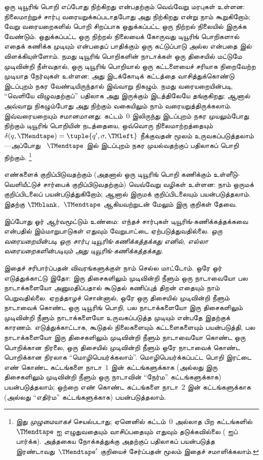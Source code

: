 \documentclass[../../../include/open-logic-section]{subfiles}
\begin{document}
ஒரு டியூரிங் பொறி எப்போது நிற்கிறது என்பதற்கும் வெவ்வேறு மரபுகள்
உள்ளன: நிலைமாற்றுச் சார்பு வரையறுக்கப்படாதபோது அது நிற்கிறது என்று
நாம் கூறுகிறோம்; வேறு வரையறைகளில் பொறி சிறப்பாக ஒதுக்கப்பட்ட ஒரு
நிற்றல் நிலையில் இருக்க வேண்டும். ஒதுக்கப்பட்ட ஒரு நிற்றல் நிலையைக்
கோருவது டியூரிங் பொறிகளால் எதைக் கணிக்க முடியும் என்பதைப் பாதிக்கும்
ஒரு கட்டுப்பாடு அல்ல என்பதை  இல் விளக்கியுள்ளோம்.
நமது டியூரிங் பொறிகளின் நாடாக்கள் ஒரு திசையில் மட்டுமே முடிவின்றி
நீள்வதால், ஒரு டியூரிங் பொறியால் ஒரு கட்டளையைச் சரியாக நிறைவேற்ற
முடியாத நேர்வுகள் உள்ளன: அது இடக்கோடிக் கட்டத்தை வாசித்துக்கொண்டு
இடப்புறம் நகர வேண்டியிருந்தால் இவ்வாறு நிகழும். நமது வரையறையின்படி,
``வெளியே விழுவதற்குப்'' பதிலாக அது இருக்கும் இடத்திலேயே தங்குகிறது;
ஆனால் அவ்வாறு நிகழும்போது அது நிற்கும் வகையிலும் நாம் வரையறுத்திருக்கலாம்.
இவ்வரையறையும் சமானமானது: கட்டம்~$0$ இலிருந்து இடப்புறம் நகர முயலும்போது
நிற்கும் டியூரிங் பொறியின் நடத்தையை, ஒவ்வொரு நிலைமாற்றத்தையும்
$\delta(q,\TMendtape) =
\tuple{q',\sigma,\TMleft}$ நீக்குவதன் மூலம் உருவகப்படுத்தலாம்---அப்போது
~$\TMendtape$ இல் இடப்புறம் நகர முயல்வதற்குப் பதிலாகப் பொறி நிற்கும்.
\footnote{இது \emph{முழுமையாகச்} செயல்படாது; ஏனெனில் கட்டம்~$0$
அல்லாத பிற கட்டங்களில் $\TMendtape$ ஐ எழுதுவதையும் வாசிப்பதையும்
எதுவும் தடுக்கவில்லை ( ஐப் பார்க்க). அத்தகைய
நோக்கத்துக்கு அதற்குப் பதிலாகப் பயன்படுத்த இரண்டாவது~$\TMendtape'$
குறியைச் சேர்ப்பதன் மூலம் இதைச் சமாளிக்கலாம்.}

எண்களைக் குறிப்பிடுவதற்கும் (அதனால் ஒரு டியூரிங் பொறி கணிக்கும்
உள்ளீடு-வெளியீட்டுச் சார்பைக் குறிப்பிடுவதற்கும்) வெவ்வேறு வழிகள்
உள்ளன: நாம் ஒருமக் குறிப்பிடலைப் பயன்படுத்துகிறோம்; ஆனால் இருமக்
குறிப்பிடலையும் பயன்படுத்தலாம். இதற்கு $\TMblank$,~$\TMendtape$
ஆகியவற்றுடன் மேலும் இரு குறிகள் தேவை.

இப்போது ஓர் ஆர்வமூட்டும் உண்மை: எந்தச் சார்புகள்
டியூரிங்-கணிக்கத்தக்கவை என்பதில் இம்மாறுபாடுகள் எதுவும் வேறுபாட்டை
ஏற்படுத்துவதில்லை. \emph{ஒரு வரையறையின்படி ஒரு சார்பு
டியூரிங்-கணிக்கத்தக்கது எனில், எல்லா வரையறைகளின்படியும் அது
டியூரிங்-கணிக்கத்தக்கது.}

இதைச் சரிபார்ப்பதன் விவரங்களுக்குள் நாம் செல்ல மாட்டோம். ஒரே ஓர்
எடுத்துக்காட்டு இதோ: இரு திசைகளிலும் முடிவின்றி நீளும் ஒரு நாடாவையோ
பல நாடாக்களையோ அனுமதிப்பதால் கூடுதல் கணிப்புத் திறன் எதையும் நாம்
பெறுவதில்லை. ஏறத்தாழச் சொன்னால், ஒரே ஒரு திசையில் முடிவின்றி நீளும்
நாடாவைக் கொண்ட ஒரு டியூரிங் பொறி, பல நாடாக்களையோ இரு திசைகளிலும்
முடிவின்றி நீளும் நாடாக்களையோ உருவகப்படுத்த முடியும் என்பதே இதற்குக்
காரணம். எடுத்துக்காட்டாக, கூடுதல் நிலைகளையும் கட்டளைகளையும் பயன்படுத்தி,
பல நாடாக்களையோ இரு திசைகளிலும் முடிவின்றி நீளும் நாடாவையோ கொண்ட ஒரு
பொறிக்கான நிரலை, ஒரு திசையில் முடிவின்றி நீளும் ஒரே நாடாவைக் கொண்ட
பொறிக்கான நிரலாக ``மொழிபெயர்க்கலாம்''. மொழிபெயர்க்கப்பட்ட பொறி இரட்டை
எண் கொண்ட கட்டங்களை நாடா~$1$ இன் கட்டங்களுக்காக (அல்லது இரு திசைகளிலும்
முடிவின்றி நீளும் ஒரு நாடாவின் ``நேர்ம'' கட்டங்களுக்காக) பயன்படுத்தலாம்;
ஒற்றை எண் கொண்ட கட்டங்களை நாடா~$2$ இன் கட்டங்களுக்காக (அல்லது
``எதிர்ம'' கட்டங்களுக்காக) பயன்படுத்தலாம்.
\end{document}
